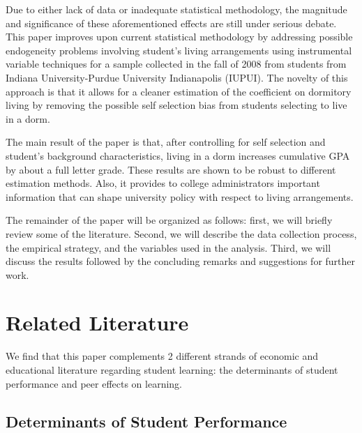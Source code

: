 \documentclass[12pt]{article}
\begin{document}
Due to either lack of data or inadequate statistical methodology, the magnitude and significance of these aforementioned effects are still under serious debate. This paper improves upon current statistical methodology by addressing possible endogeneity problems involving student's living arrangements using instrumental variable techniques for a sample collected in the fall of 2008 from students from Indiana University-Purdue University Indianapolis (IUPUI). The novelty of this approach is that it allows for a cleaner estimation of the coefficient on dormitory living by removing the possible self selection bias from students selecting to live in a dorm.

The main result of the paper is that, after controlling for self selection and student's background characteristics, living in a dorm increases cumulative GPA by about a full letter grade. These results are shown to be robust to different estimation methods. Also, it provides to college administrators important information that can shape university policy with respect to living arrangements.

The remainder of the paper will be organized as follows: first, we will briefly review some of the literature. Second, we will describe the data collection process, the empirical strategy, and the variables used in the analysis. Third, we will discuss the results followed by the concluding remarks and suggestions for further work.

\section{Related Literature}

We find that this paper complements 2 different strands of economic and educational literature regarding student learning: the determinants of student performance and peer effects on learning.

\subsection{Determinants of Student Performance}
\end{document}
